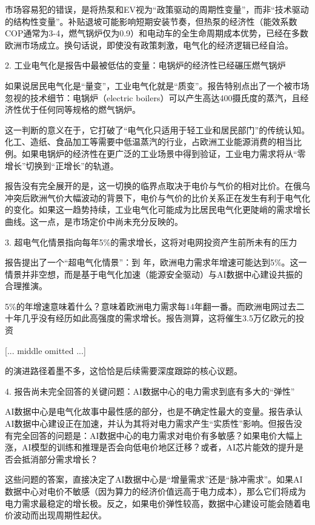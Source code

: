 \documentclass[11pt]{ctexart}
\begin{document}
市场容易犯的错误，是将热泵和EV视为“政策驱动的周期性变量”，而非“技术驱动的结构性变量”。补贴退坡可能影响短期安装节奏，但热泵的经济性（能效系数COP通常为3-4，燃气锅炉仅为0.9）和电动车的全生命周期成本优势，已经在多数欧洲市场成立。换句话说，即使没有政策刺激，电气化的经济逻辑已经自洽。

2. 工业电气化是报告中最被低估的变量：电锅炉的经济性已经碾压燃气锅炉

如果说居民电气化是“量变”，工业电气化就是“质变”。报告特别点出了一个被市场忽视的技术细节：电锅炉（electric boilers）可以产生高达400摄氏度的蒸汽，且经济性优于任何同等规格的燃气锅炉。

这一判断的意义在于，它打破了“电气化只适用于轻工业和居民部门”的传统认知。化工、造纸、食品加工等需要中低温蒸汽的行业，占欧洲工业能源消费的相当比例。如果电锅炉的经济性在更广泛的工业场景中得到验证，工业电力需求将从“零增长”切换到“正增长”的轨道。

报告没有完全展开的是，这一切换的临界点取决于电价与气价的相对比价。在俄乌冲突后欧洲气价大幅波动的背景下，电价与气价的比价关系正在发生有利于电气化的变化。如果这一趋势持续，工业电气化可能成为比居民电气化更陡峭的需求增长曲线。这一点，是市场定价中尚未充分反映的。

3. 超电气化情景指向每年5\%的需求增长，这将对电网投资产生前所未有的压力

报告提出了一个“超电气化情景”：到 年，欧洲电力需求年增速可能达到5\%。这一情景并非空想，而是基于电气化加速（能源安全驱动）与AI数据中心建设共振的合理推演。

5\%的年增速意味着什么？意味着欧洲电力需求每14年翻一番。而欧洲电网过去二十年几乎没有经历如此高强度的需求增长。报告测算，这将催生3.5万亿欧元的投资

[... middle omitted ...]

的演进路径着墨不多，这恰恰是后续需要深度跟踪的核心议题。

4. 报告尚未完全回答的关键问题：AI数据中心的电力需求到底有多大的“弹性”

AI数据中心是电气化故事中最性感的部分，也是不确定性最大的变量。报告承认AI数据中心建设正在加速，并认为其将对电力需求产生“实质性”影响。但报告没有完全回答的问题是：AI数据中心的电力需求对电价有多敏感？如果电价大幅上涨，AI模型的训练和推理是否会向低电价地区迁移？或者，AI芯片能效的提升是否会抵消部分需求增长？

这些问题的答案，直接决定了AI数据中心是“增量需求”还是“脉冲需求”。如果AI数据中心对电价不敏感（因为算力的经济价值远高于电力成本），那么它们将成为电力需求最稳定的增长极。反之，如果电价弹性较高，数据中心建设可能会随着电价波动而出现周期性起伏。
\end{document}
